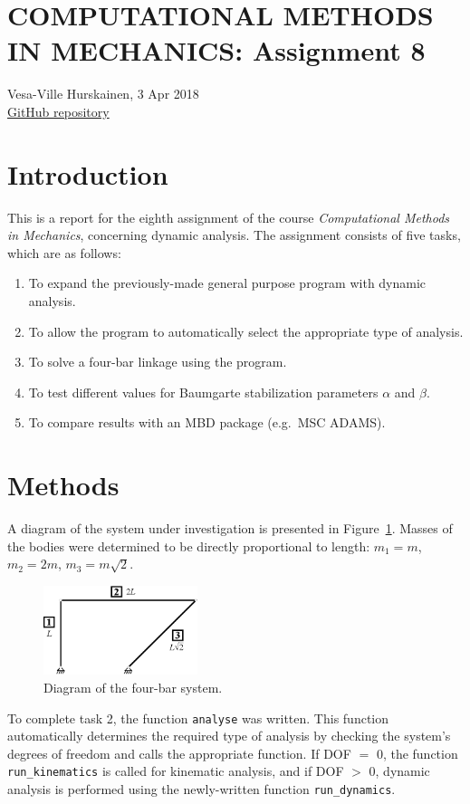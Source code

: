 \documentclass{article}
\begin{document}
\section*{COMPUTATIONAL METHODS IN MECHANICS: Assignment 8}
Vesa-Ville Hurskainen, 3 Apr 2018\\
\href{https://github.com/VesaVilleHurskainen/cmim2018}{GitHub repository}


\section*{Introduction}
This is a report for the eighth assignment of the course \textit{Computational Methods in Mechanics}, concerning dynamic analysis. The assignment consists of five tasks, which are as follows:
\begin{enumerate}
	\setlength\itemsep{0pt}
	\item To expand the previously-made general purpose program with dynamic analysis.
	\item To allow the program to automatically select the appropriate type of analysis.
	\item To solve a four-bar linkage using the program.
	\item To test different values for Baumgarte stabilization parameters $\alpha$ and $\beta$.
	\item To compare results with an MBD package (e.g.~MSC ADAMS).
\end{enumerate}


\section*{Methods}
A diagram of the system under investigation is presented in Figure~\ref*{fig:system}. Masses of the bodies were determined to be directly proportional to length: $m_1 = m$, $m_2 = 2m$, $m_3 = m \sqrt{2}$.
\begin{figure}[htb]
	\centering
	\includegraphics[width=0.4\textwidth]{system.eps}
	\caption{Diagram of the four-bar system.\label{fig:system}}
\end{figure}

To complete task 2, the function \texttt{analyse} was written. This function automatically determines the required type of analysis by checking the system's degrees of freedom and calls the appropriate function. If DOF $=$ 0, the function \texttt{run\_kinematics} is called for kinematic analysis, and if DOF $>$ 0, dynamic analysis is performed using the newly-written function \texttt{run\_dynamics}.
\end{document}
